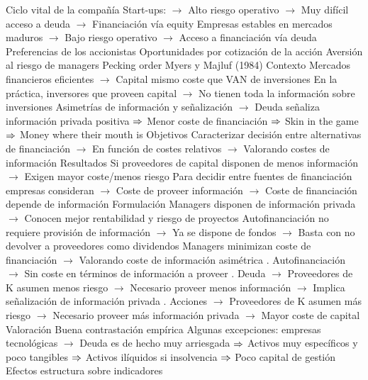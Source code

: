 \documentclass{nuevotema}
\begin{document}
\begin{esquemal}
				\4 Ciclo vital de la compañía
				\4[] Start-ups:
				\4[] $\to$ Alto riesgo operativo
				\4[] $\to$ Muy difícil acceso a deuda
				\4[] $\to$ Financiación vía equity
				\4[] Empresas estables en mercados maduros
				\4[] $\to$ Bajo riesgo operativo
				\4[] $\to$ Acceso a financiación vía deuda
				\4 Preferencias de los accionistas
				\4 Oportunidades por cotización de la acción
				\4 Aversión al riesgo de managers
			\3 Pecking order
				\4 Myers y Majluf (1984)
				\4 Contexto
				\4[] Mercados financieros eficientes
				\4[] $\to$ Capital mismo coste que VAN de inversiones
				\4[] En la práctica, inversores que proveen capital
				\4[] $\to$ No tienen toda la información sobre inversiones
				\4[] Asimetrías de información y señalización
				\4[] $\to$ Deuda señaliza información privada positiva
				\4[] $\Rightarrow$ Menor coste de financiación
				\4[] $\Rightarrow$ Skin in the game
				\4[] $\Rightarrow$ Money where their mouth is
				\4 Objetivos
				\4[] Caracterizar decisión entre alternativas de financiación
				\4[] $\to$ En función de costes relativos
				\4[] $\to$ Valorando costes de información
				\4 Resultados
				\4[] Si proveedores de capital disponen de menos información
				\4[] $\to$ Exigen mayor coste/menos riesgo
				\4[] Para decidir entre fuentes de financiación empresas consideran
				\4[] $\to$ Coste de proveer información
				\4[] $\to$ Coste de financiación depende de información
				\4 Formulación
				\4[] Managers disponen de información privada
				\4[] $\to$ Conocen mejor rentabilidad y riesgo de proyectos
				\4[] Autofinanciación no requiere provisión de información
				\4[] $\to$ Ya se dispone de fondos
				\4[] $\to$ Basta con no devolver a proveedores como dividendos
				\4[] Managers minimizan coste de financiación
				\4[] $\to$ Valorando coste de información asimétrica
				. Autofinanciación
				\4[] $\to$ Sin coste en términos de información a proveer
				. Deuda
				\4[] $\to$ Proveedores de K asumen menos riesgo
				\4[] $\to$ Necesario proveer menos información
				\4[] $\to$ Implica señalización de información privada
				. Acciones
				\4[] $\to$ Proveedores de K asumen más riesgo
				\4[] $\to$ Necesario proveer más información privada
				\4[] $\to$ Mayor coste de capital
				\4 Valoración
				\4[] Buena contrastación empírica
				\4[] Algunas excepciones: empresas tecnológicas
				\4[] $\to$ Deuda es de hecho muy arriesgada
				\4[] $\Rightarrow$ Activos muy específicos y poco tangibles
				\4[] $\Rightarrow$ Activos ilíquidos si insolvencia
				\4[] $\Rightarrow$ Poco capital de gestión
		\2 Efectos estructura sobre indicadores

\end{esquemal}
\end{document}

